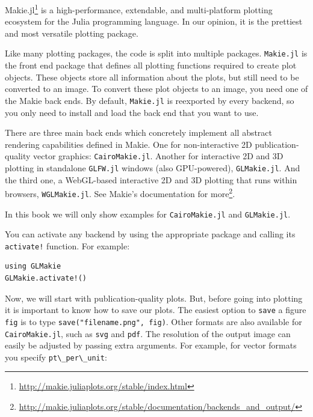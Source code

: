 \documentclass[
  notoc %
]{tufte-book}
\DeclareRobustCommand{\href}[2]{#2\footnote{\url{#1}}}
\newcommand{\passthrough}[1]{#1}
\begin{document}
\href{http://makie.juliaplots.org/stable/index.html}{Makie.jl} is a
high-performance, extendable, and multi-platform plotting ecosystem for
the Julia programming language. In our opinion, it is the prettiest and
most versatile plotting package.

Like many plotting packages, the code is split into multiple packages.
\passthrough{\lstinline!Makie.jl!} is the front end package that defines
all plotting functions required to create plot objects. These objects
store all information about the plots, but still need to be converted to
an image. To convert these plot objects to an image, you need one of the
Makie back ends. By default, \passthrough{\lstinline!Makie.jl!} is
reexported by every backend, so you only need to install and load the
back end that you want to use.

There are three main back ends which concretely implement all abstract
rendering capabilities defined in Makie. One for non-interactive 2D
publication-quality vector graphics:
\passthrough{\lstinline!CairoMakie.jl!}. Another for interactive 2D and
3D plotting in standalone \passthrough{\lstinline!GLFW.jl!} windows
(also GPU-powered), \passthrough{\lstinline!GLMakie.jl!}. And the third
one, a WebGL-based interactive 2D and 3D plotting that runs within
browsers, \passthrough{\lstinline!WGLMakie.jl!}.
\href{http://makie.juliaplots.org/stable/documentation/backends_and_output/}{See
Makie's documentation for more}.

In this book we will only show examples for
\passthrough{\lstinline!CairoMakie.jl!} and
\passthrough{\lstinline!GLMakie.jl!}.

You can activate any backend by using the appropriate package and
calling its \passthrough{\lstinline"activate!"} function. For example:

\begin{lstlisting}
using GLMakie
GLMakie.activate!()
\end{lstlisting}

Now, we will start with publication-quality plots. But, before going
into plotting it is important to know how to save our plots. The easiest
option to \passthrough{\lstinline!save!} a figure
\passthrough{\lstinline!fig!} is to type
\passthrough{\lstinline!save("filename.png", fig)!}. Other formats are
also available for \passthrough{\lstinline!CairoMakie.jl!}, such as
\passthrough{\lstinline!svg!} and \passthrough{\lstinline!pdf!}. The
resolution of the output image can easily be adjusted by passing extra
arguments. For example, for vector formats you specify
\passthrough{\lstinline!pt\_per\_unit!}:
\end{document}

